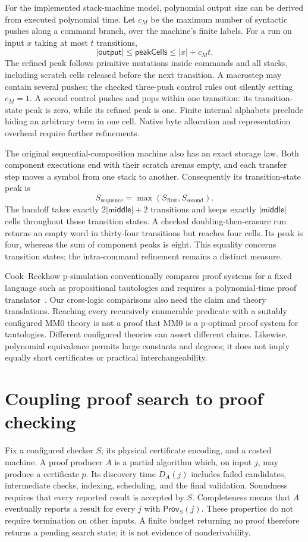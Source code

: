 \documentclass[11pt]{article}
\newcommand{\Prov}{\mathsf{Prov}}
\newcommand{\size}[1]{\lvert #1\rvert}
\begin{document}
For the implemented stack-machine model, polynomial output size can be
derived from executed polynomial time. Let $c_M$ be the maximum number of
syntactic pushes along a command branch, over the machine's finite labels.
For a run on input $x$ taking at most $t$ transitions,
\[
 \size{\mathsf{output}}\le\mathsf{peakCells}\le\size{x}+c_Mt.
\]
The refined peak follows primitive mutations inside commands and all stacks,
including scratch cells released before the next transition. A macrostep may
contain several pushes; the checked three-push control rules out silently
setting $c_M=1$. A second control pushes and pops within one transition:
its transition-state peak is zero, while its refined peak is one.
Finite internal alphabets preclude hiding an arbitrary term in one cell.
Native byte allocation and representation overhead require further refinements.

The original sequential-composition machine also has an exact storage law.
Both component executions end with their scratch arenas empty, and each
transfer step moves a symbol from one stack to another. Consequently its
transition-state peak is
\[
 S_{\mathrm{sequence}}=\max(S_{\mathrm{first}},S_{\mathrm{second}}).
\]
The handoff takes exactly $2\size{\mathsf{middle}}+2$ transitions and keeps
exactly $\size{\mathsf{middle}}$ cells throughout those transition states.
A checked doubling-then-erasure run returns an empty word in thirty-four
transitions but reaches four cells. Its peak is four, whereas the sum of
component peaks is eight. This equality concerns transition states;
the intra-command refinement remains a distinct measure.

Cook--Reckhow p-simulation conventionally compares proof systems for a
fixed language such as propositional tautologies and requires a
polynomial-time proof translator~\cite{cook}. Our cross-logic comparisons
also need the claim and theory translations. Reaching every recursively
enumerable predicate with a suitably configured MM0 theory is not a proof
that MM0 is a p-optimal proof system for tautologies. Different configured
theories can assert different claims. Likewise, polynomial equivalence
permits large constants and degrees; it does not imply equally short
certificates or practical interchangeability.

\section{Coupling proof search to proof checking}
Fix a configured checker $S$, its physical certificate encoding, and a
costed machine. A proof producer $A$ is a partial algorithm which, on
input $j$, may produce a certificate $p$. Its discovery time $D_A(j)$
includes failed candidates, intermediate checks, indexing, scheduling,
and the final validation. Soundness requires that every reported result
is accepted by $S$. Completeness means that $A$ eventually reports a
result for every $j$ with $\Prov_S(j)$. These properties do not require
termination on other inputs. A finite budget returning no proof therefore
returns a pending search state; it is not evidence of nonderivability.
\end{document}
